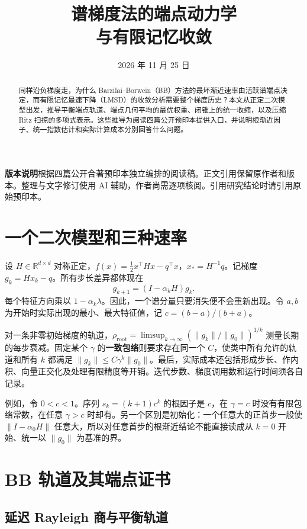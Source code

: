 \documentclass[UTF8,zihao=-4,a4paper]{ctexart}
\title{\bfseries 谱梯度法的端点动力学\\与有限记忆收敛}
\author{}
\date{2026 年 11 月 25 日}
\newcommand{\R}{\mathbb R}
\newcommand{\norm}[1]{\lVert #1\rVert}
\newcommand{\rg}{\rho_{\mathrm{root}}}
\begin{document}
\maketitle
\begin{abstract}
同样沿负梯度走，为什么 Barzilai--Borwein（BB）方法的最坏渐近速率由活跃谱端点决定，而有限记忆最速下降（LMSD）的收敛分析需要整个梯度历史？本文从正定二次模型出发，推导平衡端点轨道、端点几何平均的最优权重、闭锥上的统一收缩，以及压缩 Ritz 扫掠的多项式表示。这些推导为阅读四篇公开预印本提供入口，并说明根渐近因子、统一指数估计和实际计算成本分别回答什么问题。
\end{abstract}
\smallskip
{\small\textbf{版本说明}\quad 根据四篇公开合著预印本独立编排的阅读稿。正文引用保留原作者和版本。整理与文字修订使用 AI 辅助，作者尚需逐项核阅。引用研究结论时请引用原始预印本。}
\tableofcontents

\section{一个二次模型和三种速率}

设 $H\in\R^{d\times d}$ 对称正定，$f(x)=\tfrac12 x^\top Hx-q^\top x$，$x_*=H^{-1}q$。记梯度 $g_k=Hx_k-q$。所有步长差异都体现在
\begin{equation}\label{e:gradient}
 g_{k+1}=(I-\alpha_kH)g_k.
\end{equation}
每个特征方向乘以 $1-\alpha_k\lambda$。因此，一个谱分量只要消失便不会重新出现。令 $a,b$ 为开始时实际出现的最小、最大特征值，记 $c=(b-a)/(b+a)$。

对一条非零初始梯度的轨道，$\rg=\limsup_{k\to\infty}(\norm{g_k}/\norm{g_0})^{1/k}$ 测量长期的每步衰减。固定某个 $\gamma$ 的\textbf{一致包络}则要求存在同一个 $C$，使类中所有允许的轨道和所有 $k$ 都满足 $\norm{g_k}\le C\gamma^k\norm{g_0}$。最后，实际成本还包括形成步长、作内积、向量正交化及处理有限精度等开销。迭代步数、梯度调用数和运行时间须各自记录。

例如，令 $0<c<1$。序列 $s_k=(k+1)c^k$ 的根因子是 $c$，在 $\gamma=c$ 时没有有限包络常数，在任意 $\gamma>c$ 时却有。另一个区别是初始化：一个任意大的正首步一般使 $\norm{I-\alpha_0H}$ 任意大，所以对任意首步的根渐近结论不能直接读成从 $k=0$ 开始、统一以 $\norm{g_0}$ 为基准的界。

\section{BB 轨道及其端点证书}

\subsection{延迟 Rayleigh 商与平衡轨道}
\end{document}
